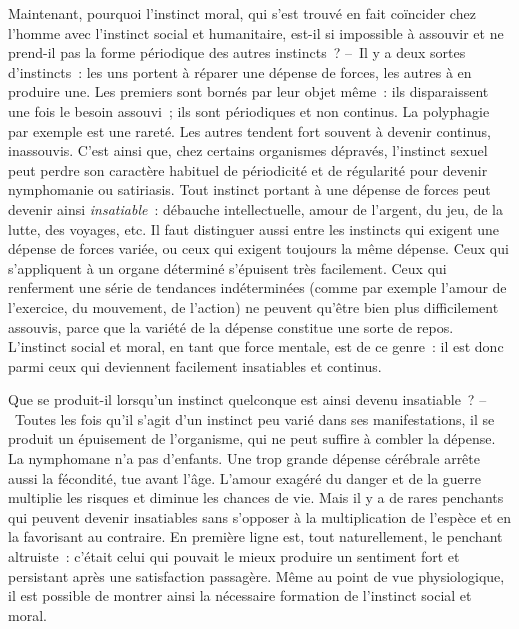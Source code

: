\documentclass[french,twoside]{book} %
\begin{document}
Maintenant, pourquoi l’instinct moral, qui s’est trouvé en fait coïncider chez l’homme avec l’instinct social et humanitaire, est-il si impossible à assouvir et ne prend-il pas la forme périodique des autres instincts ? – Il y a deux sortes d’instincts : les uns portent à réparer une dépense de forces, les autres à en produire une. Les premiers sont bornés par leur objet même : ils disparaissent une fois le besoin assouvi ; ils sont périodiques et non continus. La polyphagie par exemple est une rareté. Les autres tendent fort souvent à devenir continus, inassouvis. C’est ainsi que, chez certains organismes dépravés, l’instinct sexuel peut perdre son caractère habituel de périodicité et de régularité pour devenir nymphomanie ou satiriasis. Tout instinct portant à une dépense de forces peut devenir ainsi \emph{insatiable} : débauche intellectuelle, amour de l’argent, du jeu, de la lutte, des voyages, etc. Il faut distinguer aussi entre les instincts qui exigent une dépense de forces variée, ou ceux qui exigent toujours la même dépense. Ceux qui s’appliquent à un organe déterminé s’épuisent très facilement. Ceux qui renferment une série de tendances indéterminées (comme par exemple l’amour de l’exercice, du mouvement, de l’action) ne peuvent qu’être bien plus difficilement assouvis, parce que la variété de la dépense constitue une sorte de repos. L’instinct social et moral, en tant que force mentale, est de ce genre : il est donc parmi ceux qui deviennent facilement insatiables et continus.\par
Que se produit-il lorsqu’un instinct quelconque est ainsi devenu insatiable ? – Toutes les fois qu’il s’agit d’un instinct peu varié dans ses manifestations, il se produit un épuisement de l’organisme, qui ne peut suffire à combler la dépense. La nymphomane n’a pas d’enfants. Une trop grande dépense cérébrale arrête aussi la fécondité, tue avant l’âge. L’amour exagéré du danger et de la guerre multiplie les risques et diminue les chances de vie. Mais il y a de rares penchants qui peuvent devenir insatiables sans s’opposer à la multiplication de l’espèce et en la favorisant au contraire. En première ligne est, tout naturellement, le penchant altruiste : c’était celui qui pouvait le mieux produire un sentiment fort et persistant après une satisfaction passagère. Même au point de vue physiologique, il est possible de montrer ainsi la nécessaire formation de l’instinct social et moral.\par
\end{document}
